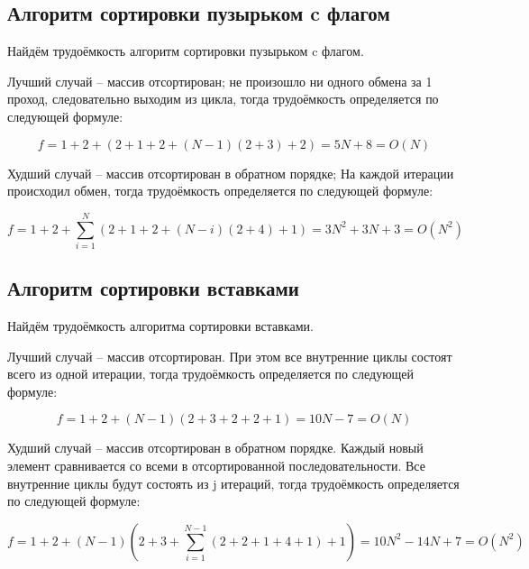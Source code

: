         \subsection{Алгоритм сортировки пузырьком c флагом}
            Найдём трудоёмкость алгоритм сортировки пузырьком c флагом.
            
            Лучший случай -- массив отсортирован; 
            не произошло ни одного обмена за 1 проход,
            следовательно выходим из цикла, тогда
            трудоёмкость определяется по следующей формуле:

            \begin{equation}
                f = 1 + 2 + (2 + 1 + 2 + (N - 1) (2 + 3) + 2) = 5N + 8= O(N)
            \end{equation}

            Худший случай -- массив отсортирован в обратном порядке; 
            На каждой итерации происходил обмен, тогда
            трудоёмкость определяется по следующей формуле:

            \begin{equation}
                f = 1 + 2 + \sum_{i=1}^N (2 + 1 + 2 + (N - i)(2 + 4) + 1) = 3N^2 + 3N + 3 = O(N^2)
            \end{equation}

        \subsection{Алгоритм сортировки вставками}
            Найдём трудоёмкость алгоритма сортировки вставками.
                
            Лучший случай -- массив отсортирован. 
            При этом все внутренние циклы состоят всего из одной итерации, тогда
            трудоёмкость определяется по следующей формуле:

            \begin{equation}
                f = 1 + 2 + (N-1)(2 + 3 + 2 + 2 + 1) = 10N - 7 = O(N)
            \end{equation}

            Худший случай -- массив отсортирован в обратном порядке. 
            Каждый новый элемент сравнивается со всеми в отсортированной последовательности.
            Все внутренние циклы будут состоять из j итераций, тогда
            трудоёмкость определяется по следующей формуле:

            \begin{equation}
                f = 1 + 2 + (N-1)(2 + 3 + \sum_{i=1}^{N-1} (2 + 2 + 1 + 4 + 1) + 1) = 10N^2 - 14N + 7 = O(N^2)
            \end{equation}

